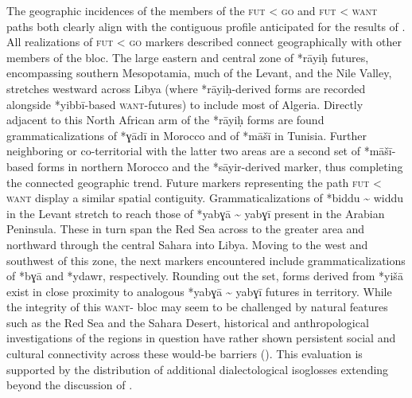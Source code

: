 \documentclass[output=paper]{langsci/langscibook}
\begin{document}
The geographic incidences of the members of the \textsc{fut} < \textsc{go} and \textsc{fut} < \textsc{want} paths both clearly align with the contiguous profile anticipated for the results of . All realizations of \textsc{fut} < \textsc{go}   markers described connect geographically with other members of the bloc. The large eastern and central zone of *rāyiḥ futures, encompassing southern Mesopotamia, much of the Levant, and the Nile Valley, stretches westward across Libya (where *rāyiḥ{}-derived forms are recorded alongside *yibbī-based \textsc{want}{}-futures) to include most of Algeria. Directly adjacent to this North African arm of the *rāyiḥ forms are found grammaticalizations of *ɣādī in Morocco and of *māšī in Tunisia. Further neighboring or co-territorial with the latter two areas are a second set of *māšī{}-based forms in northern Morocco and the  *sāyir-derived   marker, thus completing the connected geographic trend. Future markers representing the path \textsc{fut} < \textsc{want} display a similar spatial contiguity. Grammaticalizations of *biddu {\textasciitilde} widdu in the Levant stretch to reach those of *yabɣā {\textasciitilde} yabɣī present in the Arabian Peninsula. These in turn span the Red Sea across to the greater  area and northward through the central Sahara into Libya. Moving to the west and southwest of this zone, the next  markers encountered include grammaticalizations of *bɣā and *ydawr, respectively. Rounding out the set, forms derived from *yišā exist in close proximity to analogous *yabɣā {\textasciitilde} yabɣī futures in  territory. While the integrity of this \textsc{want}{}- bloc may seem to be challenged by natural features such as the Red Sea and the Sahara Desert, historical and anthropological investigations of the regions in question have rather shown persistent social and cultural connectivity across these would-be barriers (\citealt{Lydon2009,Power2012}). This evaluation is supported by the distribution of additional  dialectological isoglosses extending beyond the discussion of .
\end{document}
